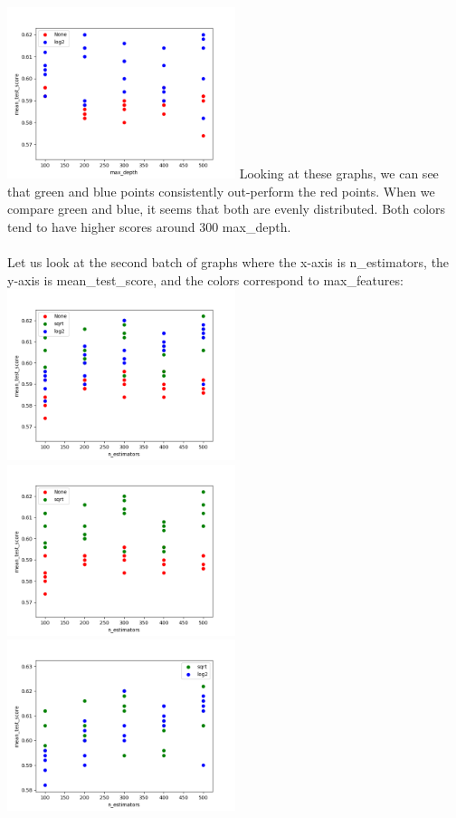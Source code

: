\documentclass[12pt]{article}
\begin{document}
\includegraphics[width=0.5\textwidth]{RF_max_depth3.png}
Looking at these graphs, we can see that green and blue points consistently out-perform the red points. When we compare green and blue, it seems that both are evenly distributed. Both colors tend to have higher scores around 300 max\_depth. \\ \\
Let us look at the second batch of graphs where the x-axis is n\_estimators, the y-axis is mean\_test\_score, and the colors correspond to max\_features: \\
\includegraphics[width=0.5\textwidth]{RF_n_estimators0.png}
\includegraphics[width=0.5\textwidth]{RF_n_estimators1.png}
\includegraphics[width=0.5\textwidth]{RF_n_estimators2.png}
\end{document}
